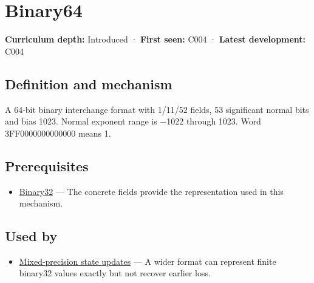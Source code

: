 \hypertarget{appendix-5078dfab64e6}{}\label{referencestart:appendix-5078dfab64e6}
\section{Binary64}\label{appendix-5078dfab64e6-binary64}

\hypertarget{appendix-5078dfab64e6-binary64}{}

\textbf{Curriculum depth:} Introduced · \textbf{First seen:} C004 · \textbf{Latest development:} C004

\begin{allmightroledefinition}

\subsection{Definition and mechanism}\label{appendix-5078dfab64e6-definition-and-mechanism}

\hypertarget{appendix-5078dfab64e6-definition-and-mechanism}{}

A 64-bit binary interchange format with 1/11/52 fields, 53 significant normal bits and bias 1023. Normal exponent range is −1022 through 1023. Word 3FF0000000000000 means 1.

\end{allmightroledefinition}

\subsection{Prerequisites}\label{appendix-5078dfab64e6-prerequisites}

\hypertarget{appendix-5078dfab64e6-prerequisites}{}

\begin{itemize}
\tightlist
\item
  \hyperref[appendix-5057f9ad327f]{Binary32} --- The concrete fields provide the representation used in this mechanism.
\end{itemize}

\subsection{Used by}\label{appendix-5078dfab64e6-used-by}

\hypertarget{appendix-5078dfab64e6-used-by}{}

\begin{itemize}
\tightlist
\item
  \hyperref[appendix-260182e617b7]{Mixed-precision state updates} --- A wider format can represent finite binary32 values exactly but not recover earlier loss.
\end{itemize}

